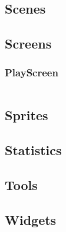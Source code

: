 \documentclass[12p]{article}
\begin{document}
\subsection{Scenes}

\subsection{Screens}
\subsubsection{PlayScreen} \label{PlayScreen.java}
\inputminted[linenos,breaklines]{java}{code/Screens/PlayScreen.java}

\subsection{Sprites}

\subsection{Statistics}

\subsection{Tools}

\subsection{Widgets}

\end{document}
